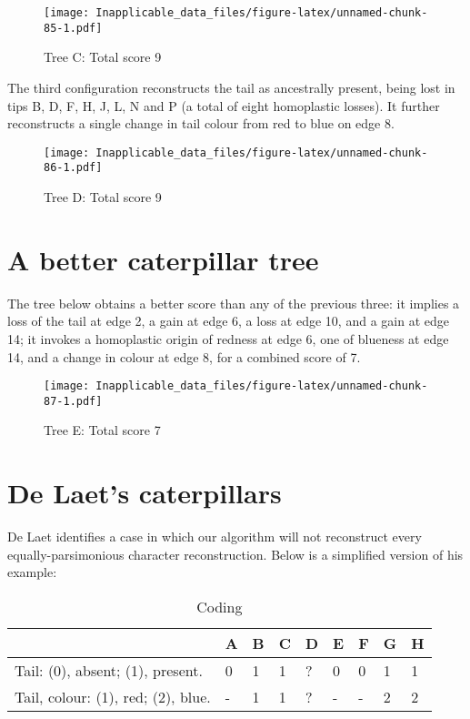 \documentclass[]{book}
\theoremstyle{definition}
\theoremstyle{definition}
\theoremstyle{definition}
\theoremstyle{remark}
\begin{document}
\begin{figure}
\centering
\texttt{[image: Inapplicable\_data\_files/figure-latex/unnamed-chunk-85-1.pdf]}
\caption{\label{fig:unnamed-chunk-85}Tree C: Total score 9}
\end{figure}

The third configuration reconstructs the tail as ancestrally present,
being lost in tips B, D, F, H, J, L, N and P (a total of eight
homoplastic losses). It further reconstructs a single change in tail
colour from red to blue on edge 8.

\begin{figure}
\centering
\texttt{[image: Inapplicable\_data\_files/figure-latex/unnamed-chunk-86-1.pdf]}
\caption{\label{fig:unnamed-chunk-86}Tree D: Total score 9}
\end{figure}

\section{A better caterpillar tree}\label{a-better-caterpillar-tree}

The tree below obtains a better score than any of the previous three: it
implies a loss of the tail at edge 2, a gain at edge 6, a loss at edge
10, and a gain at edge 14; it invokes a homoplastic origin of redness at
edge 6, one of blueness at edge 14, and a change in colour at edge 8,
for a combined score of 7.

\begin{figure}
\centering
\texttt{[image: Inapplicable\_data\_files/figure-latex/unnamed-chunk-87-1.pdf]}
\caption{\label{fig:unnamed-chunk-87}Tree E: Total score 7}
\end{figure}

\section{De Laet's caterpillars}\label{de-laets-caterpillars}

De Laet \citeyearpar{DeLaet2017} identifies a case in which our
algorithm \citep{Brazeau2018} will not reconstruct every
equally-parsimonious character reconstruction. Below is a simplified
version of his example:

\begin{table}

\caption{\label{tab:unnamed-chunk-89}Coding}
\centering
\begin{tabular}[t]{l|l|l|l|l|l|l|l|l}
\hline
  & A & B & C & D & E & F & G & H\\
\hline
Tail: (0), absent; (1), present. & 0 & 1 & 1 & ? & 0 & 0 & 1 & 1\\
\hline
Tail, colour: (1), red; (2), blue. & - & 1 & 1 & ? & - & - & 2 & 2\\
\hline
\end{tabular}
\end{table}
\end{document}
